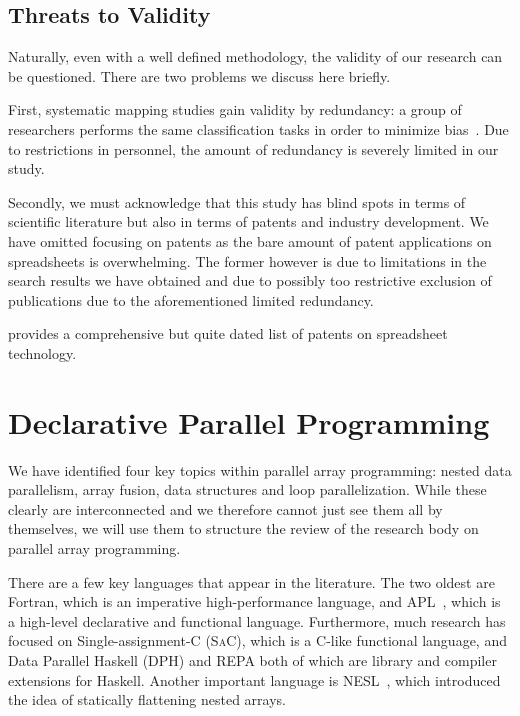 \documentclass[a4paper]{article}
\newcommand{\sac}{S\textsc{a}C}
\begin{document}
\subsection{Threats to Validity}
\label{sec:threats-validity}

Naturally, even with a well defined methodology, the validity of our research can be questioned. There are two problems we discuss here briefly.

First, systematic mapping studies gain validity by redundancy: a group of researchers performs the same classification tasks in order to minimize bias~\cite{keele2007guidelines}. Due to restrictions in personnel, the amount of redundancy is severely limited in our study.

Secondly, we must acknowledge that this study has blind spots in terms of scientific literature but also in terms of patents and industry development. We have omitted focusing on patents as the bare amount of patent applications on spreadsheets is overwhelming. The former however is due to limitations in the search results we have obtained and due to possibly too restrictive exclusion of publications due to the aforementioned limited redundancy.

\citet{Sestoft2006Spreadsheet} provides a comprehensive but quite dated list of patents on spreadsheet technology.

\section{Declarative Parallel Programming}
\label{sec:declarative-parallel-programming}

We have identified four key topics within parallel array programming: nested data parallelism, array fusion, data structures and loop parallelization. While these clearly are interconnected and we therefore cannot just see them all by themselves, we will use them to structure the review of the research body on parallel array programming.

There are a few key languages that appear in the literature. The two oldest are Fortran, which is an imperative high-performance language, and APL~\cite{Iverson1962Programming}, which is a high-level declarative and functional language. Furthermore, much research has focused on Single-assignment-C (\sac{}), which is a C-like functional language, and Data Parallel Haskell (DPH) and REPA both of which are library and compiler extensions for Haskell. Another important language is NESL~\cite{Blelloch1993NESL}, which introduced the idea of statically flattening nested arrays.
\end{document}
